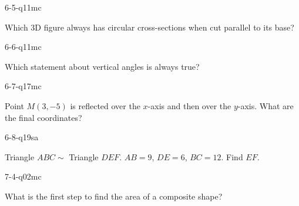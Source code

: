 \begin{practiceQuestion}{6-5-q11}{mc}
\begin{questionText}
Which 3D figure always has circular cross-sections when cut parallel to its base?
\end{questionText}
\end{practiceQuestion}

\begin{practiceQuestion}{6-6-q11}{mc}
\begin{questionText}
Which statement about vertical angles is always true?
\end{questionText}
\end{practiceQuestion}

\begin{practiceQuestion}{6-7-q17}{mc}
\begin{questionText}
Point $M(3, -5)$ is reflected over the $x$-axis and then over the $y$-axis. What are the final coordinates?
\end{questionText}
\end{practiceQuestion}

\begin{practiceQuestion}{6-8-q19}{sa}
\begin{questionText}
Triangle $ABC \sim$ Triangle $DEF$. $AB = 9$, $DE = 6$, $BC = 12$. Find $EF$.
\end{questionText}
\end{practiceQuestion}

\begin{practiceQuestion}{7-4-q02}{mc}
\begin{questionText}
What is the first step to find the area of a composite shape?
\end{questionText}
\end{practiceQuestion}

